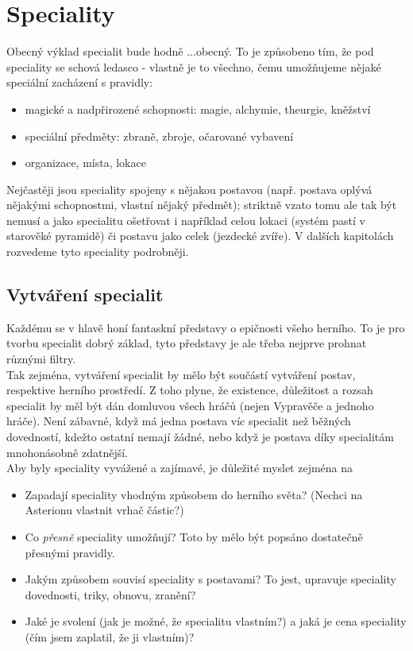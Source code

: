 \documentclass[../main.tex]{subfiles}
\begin{document}
\chapter{Speciality}

Obecný výklad specialit bude hodně ...obecný. To je způsobeno tím, že pod speciality se schová ledasco - vlastně je to všechno, čemu umožňujeme nějaké speciální zacházení s pravidly:

\begin{itemize}
\item magické a nadpřirozené schopnosti: magie, alchymie, theurgie, kněžství
\item speciální předměty: zbraně, zbroje, očarované vybavení
\item organizace, místa, lokace
\end{itemize}

Nejčastěji jsou speciality spojeny s nějakou postavou (např. postava oplývá nějakými schopnostmi, vlastní nějaký předmět); striktně vzato tomu ale tak být nemusí a jako specialitu ošetřovat i například celou lokaci (systém pastí v starověké pyramidě) či postavu jako celek (jezdecké zvíře). V dalších kapitolách rozvedeme tyto speciality podrobněji.

\section{Vytváření specialit}
\label{sec:spec-vytvareni}
Každému se v hlavě honí fantaskní představy o epičnosti všeho herního. To je pro tvorbu specialit dobrý základ, tyto představy je ale třeba nejprve prohnat různými filtry.\\
Tak zejména, vytváření specialit by mělo být součástí vytváření postav, respektive herního prostředí. Z toho plyne, že existence, důležitost a rozsah specialit by měl být dán domluvou všech hráčů (nejen Vypravěče a jednoho hráče). Není zábavné, když má jedna postava víc specialit než běžných dovedností, kdežto ostatní nemají žádné, nebo když je postava díky specialitám mnohonásobně zdatnější. \\
Aby byly speciality vyvážené a zajímavé, je důležité myslet zejména na

\begin{itemize}
\item Zapadají speciality vhodným způsobem do herního světa? (Nechci na Asterionu vlastnit vrhač částic?)
\item Co \textit{přesně} speciality umožňují? Toto by mělo být popsáno dostatečně přesnými pravidly. 
\item Jakým způsobem souvisí speciality s postavami? To jest, upravuje speciality dovednosti, triky, obnovu, zranění?
\item Jaké je svolení (jak je možné, že specialitu vlastním?) a jaká je cena speciality (čím jsem zaplatil, že ji vlastním)?
\end{itemize}
\end{document}
